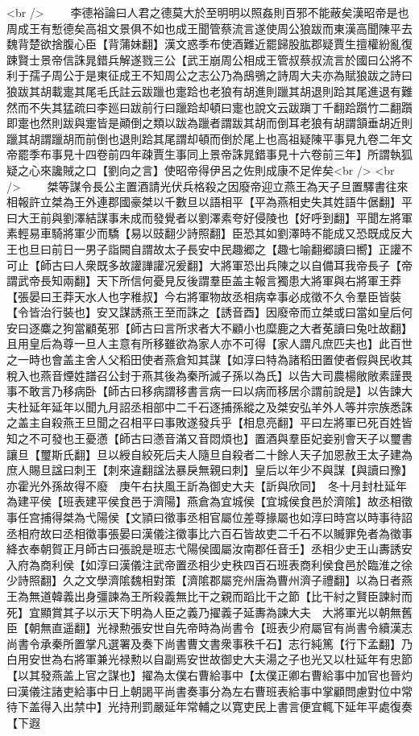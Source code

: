 <br />
　　李德裕論曰人君之德莫大於至明明以照姦則百邪不能蔽矣漢昭帝是也周成王有慙德矣高祖文景俱不如也成王聞管蔡流言遂使周公狼跋而東漢高聞陳平去魏背楚欲捨腹心臣【背蒲妹翻】漢文惑季布使酒難近罷歸股肱郡疑賈生擅權紛亂復踈賢士景帝信誅晁錯兵解遂戮三公【武王崩周公相成王管叔蔡叔流言於國曰公將不利于孺子周公于是東征成王不知周公之志公乃為䲭鴞之詩周大夫亦為賦狼跋之詩曰狼跋其胡載疐其尾毛氏註云跋躐也疐跲也老狼有胡進則躐其胡退則跲其尾進退有難然而不失其猛疏曰李廵曰跋前行曰躐跲却頓曰疐也說文云跋蹎丁千翻跲躓竹二翻躓即疐也然則跋與疐皆是顚倒之類以跋為躐者謂跋其胡而倒耳老狼有胡謂頷垂胡近則躐其胡謂躐胡而前倒也退則跲其尾謂却頓而倒於尾上也高祖疑陳平事見九卷二年文帝罷季布事見十四卷前四年疎賈生事同上景帝誅晁錯事見十六卷前三年】所謂執狐疑之心來讒賊之口【劉向之言】使昭帝得伊呂之佐則成康不足侔矣<br />
<br />
　　桀等謀令長公主置酒請光伏兵格殺之因廢帝迎立燕王為天子旦置驛書往來相報許立桀為王外連郡國豪桀以千數旦以語相平【平為燕相史失其姓語牛倨翻】平曰大王前與劉澤結謀事未成而發覺者以劉澤素夸好侵陵也【好呼到翻】平聞左將軍素輕易車騎將軍少而驕【易以豉翻少詩照翻】臣恐其如劉澤時不能成又恐既成反大王也旦曰前日一男子詣闕自謂故太子長安中民趣郷之【趣七喻翻郷讀曰嚮】正讙不可止【師古曰人衆既多故讙譁讙况爰翻】大將軍恐出兵陳之以自備耳我帝長子【帝謂武帝長知兩翻】天下所信何憂見反後謂羣臣盖主報言獨患大將軍與右將軍王莽【張晏曰王莽天水人也字稚叔】今右將軍物故丞相病幸事必成徵不久令羣臣皆裝【令皆治行裝也】安又謀誘燕王至而誅之【誘音酉】因廢帝而立桀或曰當如皇后何安曰逐麋之狗當顧莬邪【師古曰言所求者大不顧小也糜鹿之大者莬讀曰兔吐故翻】且用皇后為尊一旦人主意有所移雖欲為家人亦不可得【家人謂凡庶匹夫也】此百世之一時也會盖主舍人父稻田使者燕倉知其謀【如淳曰特為諸稻田置使者假與民收其稅入也燕音煙姓譜召公封于燕其後為秦所滅子孫以為氏】以告大司農楊敞敞素謹畏事不敢言乃移病卧【師古曰移病謂移書言病一曰以病而移居尒謂前說是】以告諫大夫杜延年延年以聞九月詔丞相部中二千石逐捕孫縱之及桀安弘羊外人等并宗族悉誅之盖主自殺燕王旦聞之召相平曰事敗遂發兵乎【相息亮翻】平曰左將軍已死百姓皆知之不可發也王憂懣【師古曰懣音滿又音悶煩也】置酒與羣臣妃妾别會天子以璽書讓旦【璽斯氏翻】旦以綬自絞死后夫人隨旦自殺者二十餘人天子加恩赦王太子建為庶人賜旦諡曰刺王【刺來違翻諡法暴戾無親曰刺】皇后以年少不與謀【與讀曰豫】亦霍光外孫故得不廢　庚午右扶風王訢為御史大夫【訢與欣同】　冬十月封杜延年為建平侯【班表建平侯食邑于濟陽】燕倉為宜城侯【宜城侯食邑於濟隂】故丞相徵事任宫捕得桀為弋陽侯【文頴曰徵事丞相官屬位差尊掾屬也如淳曰時宫以時事待詔丞相府故曰丞相徵事張晏曰漢儀注徵事比六百石皆故吏二千石不以贓罪免者為徵事絳衣奉朝賀正月師古曰張說是班志弋陽侯國屬汝南郡任音壬】丞相少史王山夀誘安入府為商利侯【如淳曰漢儀注武帝置丞相少史秩四百石班表商利侯食邑於臨淮之徐少詩照翻】久之文學濟隂魏相對策【濟隂郡屬兖州唐為曹州濟子禮翻】以為日者燕王為無道韓義出身彊諫為王所殺義無比干之親而蹈比干之節【比干紂之賢臣諫紂而死】宜顯賞其子以示天下明為人臣之義乃擢義子延夀為諫大夫　大將軍光以朝無舊臣【朝無直遥翻】光禄勲張安世自先帝時為尚書令【班表少府屬官有尚書令續漢志尚書令承秦所置掌凡選署及奏下尚書曹文書衆事秩千石】志行純篤【行下孟翻】乃白用安世為右將軍兼光禄勲以自副焉安世故御史大夫湯之子也光又以杜延年有忠節【以其發燕盖上官之謀也】擢為太僕右曹給事中【太僕正卿右曹給事中加官也晉灼曰漢儀注諸吏給事中日上朝謁平尚書奏事分為左右曹班表給事中掌顧問慮對位中常待下盖得入出禁中】光持刑罰嚴延年常輔之以寛吏民上書言便宜輒下延年平處復奏【下遐
